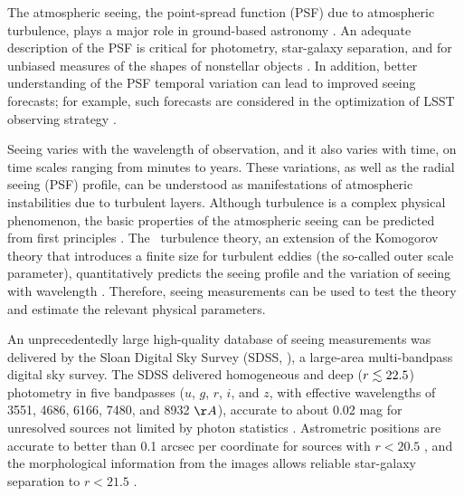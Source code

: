 

The atmospheric seeing, the point-spread function (PSF) due to atmospheric turbulence, plays
a major role in ground-based astronomy \citep{Roddier1981}. An adequate description 
of the PSF is critical for photometry, star-galaxy separation, and for unbiased measures of 
the shapes of nonstellar objects \citep{Lupton2001}. In addition, better understanding of the 
PSF temporal variation can lead to improved seeing forecasts; for example, such forecasts are 
considered in the optimization of LSST observing strategy \citep{LSSToverview}.

Seeing varies with the wavelength of observation, and it also varies with time, on time 
scales ranging from minutes to years. These variations, as well as the radial seeing (PSF) 
profile, can be understood as manifestations of atmospheric instabilities due to turbulent layers. 
Although turbulence is a complex physical phenomenon, the basic properties of the atmospheric
seeing can be predicted from first principles \citep{Racine2009}. The
\vk~turbulence theory, 
an extension of the Komogorov theory that introduces a finite size for turbulent eddies (the so-called
outer scale parameter), quantitatively predicts the seeing profile and the variation of seeing
with wavelength \citep{vk1, vk2}. Therefore, seeing measurements can be used to test the theory and estimate
the relevant physical parameters. 

An unprecedentedly large high-quality database of seeing measurements was delivered by the Sloan Digital Sky Survey (SDSS, \citealt{York2000}), a large-area multi-bandpass digital sky survey. The SDSS delivered homogeneous and deep 
($r\lesssim22.5$) photometry in five bandpasses ($u$, $g$, $r$, $i$, and $z$, with effective wavelengths 
of 3551, 4686, 6166, 7480, and 8932 $\AA$), accurate to about 0.02 mag for unresolved sources 
not limited by photon statistics \citep{Sesar2007}. Astrometric positions are accurate to better 
than 0.1 arcsec per coordinate for sources with $r<20.5$ \citep{Pier2003}, and the morphological 
information from the images allows reliable star-galaxy separation to $r<21.5$ \citep{Lupton2002}.
 
